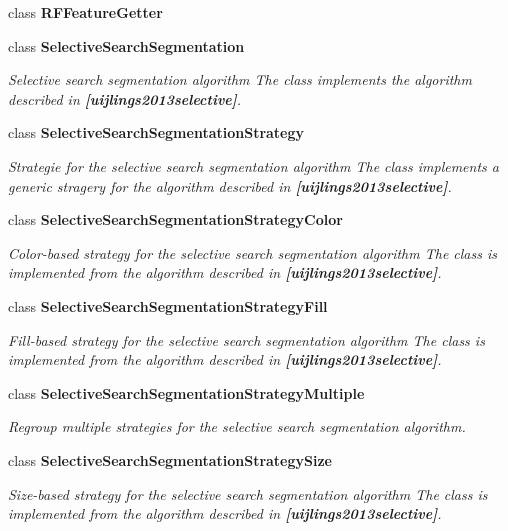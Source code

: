 \begin{DoxyCompactItemize}
class {\bfseries R\+F\+Feature\+Getter}
\item 
class {\bfseries Selective\+Search\+Segmentation}
\begin{DoxyCompactList}\small\item\em Selective search segmentation algorithm The class implements the algorithm described in {\bfseries [uijlings2013selective]}. \end{DoxyCompactList}\item 
class {\bfseries Selective\+Search\+Segmentation\+Strategy}
\begin{DoxyCompactList}\small\item\em Strategie for the selective search segmentation algorithm The class implements a generic stragery for the algorithm described in {\bfseries [uijlings2013selective]}. \end{DoxyCompactList}\item 
class {\bfseries Selective\+Search\+Segmentation\+Strategy\+Color}
\begin{DoxyCompactList}\small\item\em Color-\/based strategy for the selective search segmentation algorithm The class is implemented from the algorithm described in {\bfseries [uijlings2013selective]}. \end{DoxyCompactList}\item 
class {\bfseries Selective\+Search\+Segmentation\+Strategy\+Fill}
\begin{DoxyCompactList}\small\item\em Fill-\/based strategy for the selective search segmentation algorithm The class is implemented from the algorithm described in {\bfseries [uijlings2013selective]}. \end{DoxyCompactList}\item 
class {\bfseries Selective\+Search\+Segmentation\+Strategy\+Multiple}
\begin{DoxyCompactList}\small\item\em Regroup multiple strategies for the selective search segmentation algorithm. \end{DoxyCompactList}\item 
class {\bfseries Selective\+Search\+Segmentation\+Strategy\+Size}
\begin{DoxyCompactList}\small\item\em Size-\/based strategy for the selective search segmentation algorithm The class is implemented from the algorithm described in {\bfseries [uijlings2013selective]}. \end{DoxyCompactList}\item 

\end{DoxyCompactItemize}
